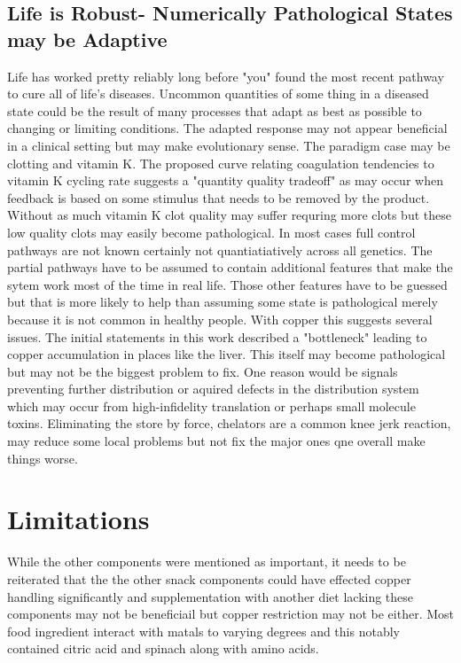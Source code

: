 \subsection{Life is Robust- Numerically Pathological States may be Adaptive }
Life has worked pretty reliably long before "you" found the
most recent pathway to cure all of life's diseases.
Uncommon quantities of some thing in a diseased state could be the
result of many processes that adapt as best as possible to changing
or limiting conditions. The adapted response may not appear beneficial
in a clinical setting but may make evolutionary sense. 
The paradigm case may be clotting and vitamin K. The proposed
curve relating coagulation tendencies to vitamin K cycling rate
suggests a "quantity quality tradeoff" as may occur when feedback
is based on some stimulus that needs to be removed by the product.
Without as much vitamin K clot quality may suffer requring 
more clots but these low quality clots may easily become pathological.
In most cases full control pathways are not known certainly
not quantiatiatively across all genetics. The partial pathways
have to be assumed to contain additional features
that make the sytem work most of the time in real life.
Those other features have to be guessed but that is more likely
to help than assuming some state is pathological merely
because it is not common in healthy people.
With copper this suggests several issues. The initial statements
in this work described a "bottleneck" leading
to copper accumulation in places like the liver. This itself
may become pathological but may not be the biggest problem
to fix. One reason would be signals preventing further distribution
or aquired defects in the distribution system which may occur 
from high-infidelity translation or perhaps small molecule toxins.  
Eliminating the store by force, chelators are a common knee
jerk reaction,  may reduce some local problems but not fix the
major ones qne overall make things worse. 


\section{Limitations}
While the other components were mentioned as important,
it needs to be reiterated that the 
the other snack components could have effected copper handling
significantly and supplementation with another diet lacking
these components may not be beneficiail but copper restriction
may not be either. Most food ingredient interact with matals 
to varying degrees and this notably contained citric acid
and spinach along with amino acids. 

